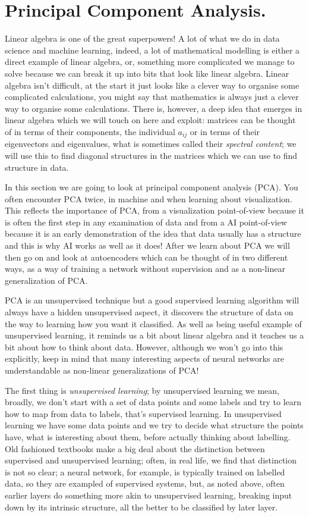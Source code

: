 \documentclass[12pt]{article}
\begin{document}
\section*{Principal Component Analysis.} 

Linear algebra is one of the great superpowers! A lot of what we do in
data science and machine learning, indeed, a lot of mathematical
modelling is either a direct example of linear algebra, or, something
more complicated we manage to solve because we can break it up into
bits that look like linear algebra. Linear algebra isn't difficult, at
the start it just looks like a clever way to organise some complicated
calculations, you might say that mathematics is always just a clever
way to organise some calculations. There is, however, a deep idea that
emerges in linear algebra which we will touch on here and exploit:
matrices can be thought of in terms of their components, the
individual $a_{ij}$ or in terms of their eigenvectors and eigenvalues,
what is sometimes called their \emph{spectral content}; we will use
this to find diagonal structures in the matrices which we can use to
find structure in data.

In this section we are going to look at principal component analysis
(PCA). You often encounter PCA twice, in machine and when learning
about visualization. This reflects the importance of PCA, from a
visualization point-of-view because it is often the first step in any
examination of data and from a AI point-of-view because it is an early
demonstration of the idea that data usually has a structure and this
is why AI works as well as it does! After we learn about PCA we will
then go on and look at autoencoders which can be thought of in two
different ways, as a way of training a network without supervision and
as a non-linear generalization of PCA.

PCA is an unsupervised technique but a good supervised learning
algorithm will always have a hidden unsupervised aspect, it discovers
the structure of data on the way to learning how you want it
classified. As well as being useful example of unsupervised learning,
it reminds us a bit about linear algebra and it teaches us a bit about
how to think about data. However, although we won't go into this
explicitly, keep in mind that many interesting aspects of neural
networks are understandable as non-linear generalizations of PCA!

The first thing is \textsl{unsupervised learning}; by unsupervised
learning we mean, broadly, we don't start with a set of data points
and some labels and try to learn how to map from data to labels,
that's supervised learning. In unsupervised learning we have some data
points and we try to decide what structure the points have, what is
interesting about them, before actually thinking about labelling. Old
fashioned textbooks make a big deal about the distinction between
supervised and unsupervised learning; often, in real life, we find
that distinction is not so clear; a neural network, for example, is
typically trained on labelled data, so they are exampled of supervised
systems, but, as noted above, often earlier layers do something more
akin to unsupervised learning, breaking input down by its intrinsic
structure, all the better to be classified by later layer.
\end{document}
